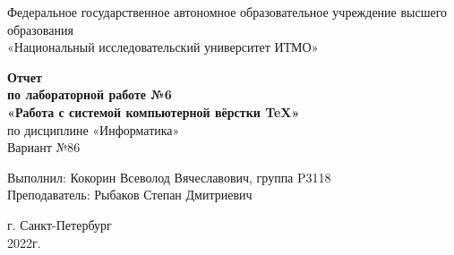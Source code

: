 \documentclass[12pt,onecolumn]{article}
\begin{document}
\begin{center}
    Федеральное государственное автономное образовательное учреждение высшего образования\\
	«Национальный исследовательский университет ИТМО»
\end{center}
\vspace{1cm}
\setcounter{page}{0} 
\begin{center}
    \large \textbf{Отчет}\\
    \textbf{по лабораторной работе №6}\\
    \large \textbf{«Работа с системой компьютерной вёрстки \TeX»}\\
     по дисциплине «Информатика»\\
	\vspace{1cm}
    Вариант №86\\
\end{center}

\vspace{10cm}
\begin{flushright}
  Выполнил: Кокорин Всеволод Вячеславович, группа P3118\\
  Преподаватель: Рыбаков Степан Дмитриевич\\
\end{flushright}

\vspace{5cm}
\begin{center}
    г. Санкт-Петербург\\
    2022г.
\end{center}
\thispagestyle{empty}
\newpage
\tableofcontents
\newpage
\end{document}
